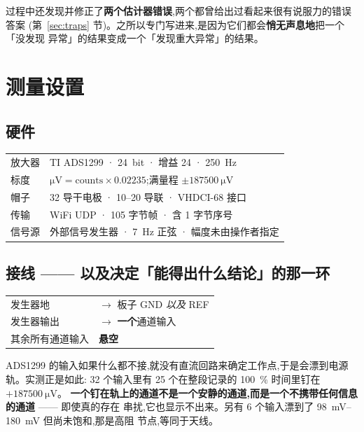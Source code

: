 \documentclass[11pt]{ctexart}
\begin{document}
过程中还发现并修正了\textbf{两个估计器错误},两个都曾给出过看起来很有说服力的错误答案
(第~\ref{sec:traps} 节)。之所以专门写进来,是因为它们都会\textbf{悄无声息地}把一个「没发现
异常」的结果变成一个「发现重大异常」的结果。

\section{测量设置}

\subsection*{硬件}

\begin{center}
\begin{tabular}{ll}
\toprule
放大器 & TI ADS1299 · \SI{24}{bit} · 增益 24 · \SI{250}{\hertz} \\
标度 & $\si{\micro\volt} = \text{counts} \times 0.02235$;满量程 $\pm\SI{187500}{\micro\volt}$ \\
帽子 & 32 导干电极 · 10--20 导联 · VHDCI-68 接口 \\
传输 & WiFi UDP · 105 字节帧 · 含 1 字节序号 \\
信号源 & 外部信号发生器 · \SI{7}{\hertz} 正弦 · 幅度未由操作者指定 \\
\bottomrule
\end{tabular}
\end{center}

\subsection*{接线 —— 以及决定「能得出什么结论」的那一环}

\begin{center}
\begin{tabular}{ll}
发生器地 & $\rightarrow$ 板子 GND \emph{以及} REF \\
发生器输出 & $\rightarrow$ \textbf{一个}通道输入 \\
其余所有通道输入 & \textbf{悬空} \\
\end{tabular}
\end{center}

ADS1299 的输入如果什么都不接,就没有直流回路来确定工作点,于是会漂到电源轨。实测正是如此:
32 个输入里有 25 个在整段记录的 \SI{100}{\percent} 时间里钉在 $+\SI{187500}{\micro\volt}$。
\textbf{一个钉在轨上的通道不是一个安静的通道,而是一个不携带任何信息的通道} —— 即使真的存在
串扰,它也显示不出来。另有 6 个输入漂到了 \SIrange{98}{180}{\milli\volt} 但尚未饱和,那是高阻
节点,等同于天线。
\end{document}
